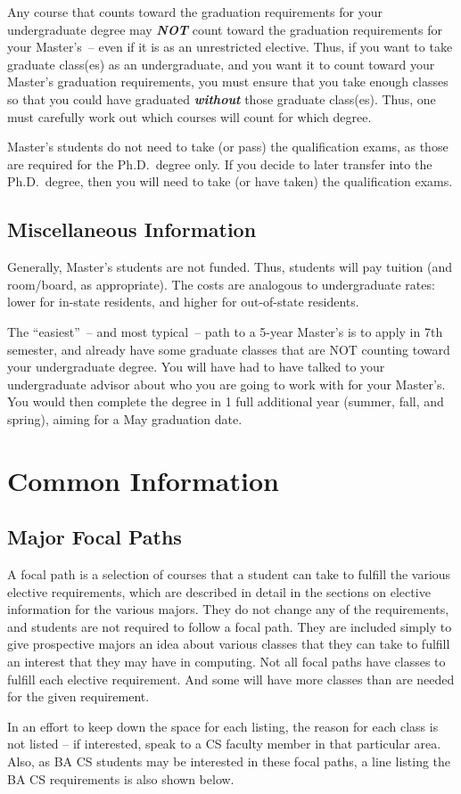 \documentclass[10pt,letter]{book}
\newcommand{\mychapter}[2]{\chapter{#1}\renewcommand{\leftmark}{\textsc{#2}}}
\newcommand{\mysection}[1]{\section{#1}\renewcommand{\rightmark}{#1}}
\begin{document}
Any course that counts toward the graduation requirements for your
undergraduate degree may {\em\bf NOT} count toward the graduation
requirements for your Master's~-- even if it is as an unrestricted
elective.  Thus, if you want to take graduate class(es) as an
undergraduate, and you want it to count toward your Master's
graduation requirements, you must ensure that you take enough classes
so that you could have graduated {\em\bf without} those graduate
class(es).  Thus, one must carefully work out which courses will count
for which degree.

Master's students do not need to take (or pass) the qualification
exams, as those are required for the Ph.D.\ degree only.  If you
decide to later transfer into the Ph.D.\ degree, then you will need to
take (or have taken) the qualification exams.

\mysection{Miscellaneous Information}

Generally, Master's students are not funded.  Thus, students will pay
tuition (and room/board, as appropriate).  The costs are analogous to
undergraduate rates: lower for in-state residents, and higher for
out-of-state residents.

The ``easiest''~-- and most typical~-- path to a 5-year Master's is to
apply in 7th semester, and already have some graduate classes that are
NOT counting toward your undergraduate degree.  You will have had to
have talked to your undergraduate advisor about who you are going to
work with for your Master's.  You would then complete the degree in 1
full additional year (summer, fall, and spring), aiming for a May
graduation date.


\clearpage
\mychapter{Common Information}{Common Information}

\mysection{Major Focal Paths}

A focal path is a selection of courses that a student can take to
fulfill the various elective requirements, which are described in
detail in the sections on elective information for the various
majors. They do not change any of the requirements, and students are
not required to follow a focal path. They are included simply to give
prospective majors an idea about various classes that they can take to
fulfill an interest that they may have in computing. Not all focal
paths have classes to fulfill each elective requirement. And some will
have more classes than are needed for the given requirement.

In an effort to keep down the space for each listing, the reason for
each class is not listed – if interested, speak to a CS faculty member
in that particular area. Also, as BA CS students may be interested in
these focal paths, a line listing the BA CS requirements is also shown
below.
\end{document}
